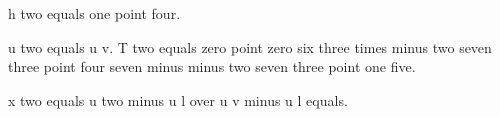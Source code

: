 h two equals one point four.

u two equals u v. T two equals zero point zero six three times minus two seven three point four seven minus minus two seven three point one five.

x two equals u two minus u l over u v minus u l equals.